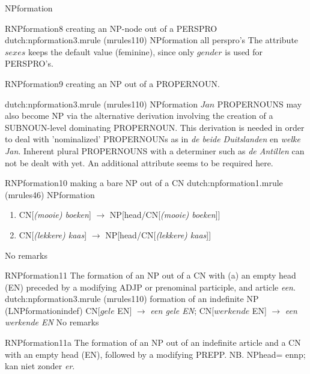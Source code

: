 \begin{mruleclass}{NPformation}
\begin{members}
\begin{member}
\end{member}
\begin{member}
 RNPformation8
 creating an NP-node out of a PERSPRO
\file dutch:npformation3.mrule (mrules110)
\semantics NPformation
\example  all perspro's
\remarks\mbox{}
The attribute $sexes$ keeps the default value (feminine), since only 
$gender$
is used for PERSPRO's.

\end{member}
\begin{member}
 RNPformation9
 creating an NP out of a PROPERNOUN. 

\file dutch:npformation3.mrule (mrules110)
\semantics NPformation
\example $Jan$ 
\remarks 
PROPERNOUNS may also become NP via the alternative derivation involving the 
creation of a SUBNOUN-level dominating PROPERNOUN. 
This derivation is needed in order to deal with 'nominalized' PROPERNOUNs as in 
{\em de beide Duitslanden} en {\em welke Jan}.
Inherent plural PROPERNOUNS with a determiner such as {\em de Antillen} can not 
be dealt with yet. An additional attribute seems to be required here.
\end{member}

\begin{member}
 RNPformation10
 making a bare NP out of a  CN
\file dutch:npformation1.mrule (mrules46)
\semantics NPformation
\example 
\mbox{}\\
\begin{enumerate}
\item
CN[{\em (mooie) boeken}] 
$\rightarrow$ 
NP[head/CN[{\em (mooie) boeken}]]
\item
 CN[{\em (lekkere) kaas}]
$\rightarrow$ 
NP[head/CN[{\em (lekkere) kaas}]]
\end{enumerate}
\remarks No remarks
\end{member}

\begin{member}
 RNPformation11
The formation of an NP out of a CN with (a) an empty head (EN) preceded by a
modifying ADJP or prenominal participle, and article {\em een}.
\file dutch:npformation3.mrule (mrules110)
\semantics formation of an indefinite NP  (LNPformationindef)
\example
CN[$gele$ EN]
$\rightarrow$ 
{\em een gele EN}; 
CN[$werkende$ EN]
$\rightarrow$ 
{\em een werkende EN}
\remarks No remarks
\end{member}
\begin{member}
 RNPformation11a
The formation of an NP out of an indefinite article and a
  CN with an empty head (EN), followed by a 
modifying PREPP.
NB. NPhead= ennp; kan niet zonder {\em er}.


\end{member}
\end{members}
\end{mruleclass}
